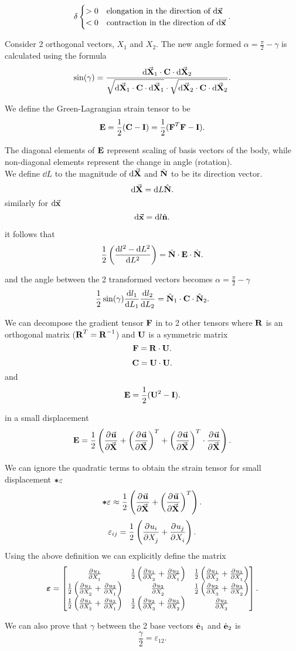 \documentclass{report}
\begin{document}
\[
	\delta \begin{cases}
		>0 & \text{elongation in the direction of }\dd{\va{x}}  \\
		<0 & \text{contraction in the direction of }\dd{\va{x}}
	\end{cases}
	.\]

Consider 2 orthogonal vectors, $X_1$ and $X_2$. The new angle formed $\alpha = \frac{\pi}{2}-\gamma$ is calculated using the formula
\[
	\sin(\gamma) = \frac{\dd{\va{X}}_1\cdot\vb{C}\cdot\dd{\va{X}_2}}{\sqrt{\dd{\va{X}}_1\cdot\vb{C}\cdot\dd{\va{X}_1}}\cdot\sqrt{\dd{\va{X}}_2\cdot\vb{C}\cdot\dd{\va{X}_2}}}
	.\]

We define the Green-Lagrangian strain tensor to be
\[
	\vb{E}=\frac{1}{2}(\vb{C}-\vb{I}) = \frac{1}{2}(\vb{F}^T\vb{F}-\vb{I})
	.\]

The diagonal elements of $\vb{E}$ represent scaling of basis vectors of the body, while non-diagonal elements represent the change in angle (rotation).\\

We define $\dd{L}$ to the magnitude of $\dd{\va{X}}$ and $\vu{N}$ to be its direction vector.
\[
	\dd{\va{X}} = \dd{L}\vu{N}
	.\]
similarly for $\dd{\va{x}}$
\[
	\dd{\va{x}} = \dd{l}\vu{n}
	.\]

it follows that
\[
	\frac{1}{2}\lt(\frac{\dd{l}^2-\dd{L}^2}{\dd{L}^2}\rt) = \vu{N}\cdot\vb{E}\cdot\vu{N}
	.\]

and the angle between the 2 transformed vectors becomes $\alpha = \frac{\pi}{2}-\gamma$
\[
	\frac{1}{2}\sin(\gamma)\dv{l_1}{L_1}\dv{l_2}{L_2}=\vu{N}_1\cdot \vb{C}\cdot\vu{N}_2
	.\]

We can decompose the gradient tensor $\vb{F}$ in to 2 other tensors where $\vb{R}$ is an orthogonal matrix ($\vb{R}^T = \vb{R}^{-1}$) and $\vb{U}$ is a symmetric matrix
\[
	\vb{F}=\vb{R}\cdot\vb{U}
	.\]

\[
	\vb{C} = \vb{U}\cdot\vb{U}
	.\]
and
\[
	\vb{E} = \frac{1}{2}(\vb{U}^2-\vb{I})
	.\]

in a small displacement
\[
	\vb{E} = \frac{1}{2}\lt(\pdv{\va{u}}{\va{X}} + \lt(\pdv{\va{u}}{\va{X}}\rt)^T + \lt(\pdv{\va{u}}{\va{X}}\rt)^T\cdot \pdv{\va{u}}{\va{X}}\rt)
	.\]

We can ignore the quadratic terms to obtain the strain tensor for small displacement $\vb*{\varepsilon}$
\[
	\vb*{\varepsilon} \approx \frac{1}{2}\lt(\pdv{\va{u}}{\va{X}} + \lt(\pdv{\va{u}}{\va{X}}\rt)^T\rt)
	.\]
\[
	\varepsilon_{ij} = \frac{1}{2}\lt(\pdv{u_i}{X_j} + \pdv{u_j}{X_i}\rt)
	.\]
Using the above definition we can explicitly define the matrix
\[
	\vb{\varepsilon} = \begin{bmatrix}
		\pdv{u_1}{X_1}                                     & \frac{1}{2}\lt(\pdv{u_1}{X_2} + \pdv{u_2}{X_1}\rt) & \frac{1}{2}\lt(\pdv{u_1}{X_3} + \pdv{u_3}{X_1}\rt) \\
		\frac{1}{2}\lt(\pdv{u_1}{X_2} + \pdv{u_2}{X_1}\rt) & \pdv{u_2}{X_2}                                     & \frac{1}{2}\lt(\pdv{u_2}{X_3} + \pdv{u_3}{X_2}\rt) \\
		\frac{1}{2}\lt(\pdv{u_1}{X_3} + \pdv{u_3}{X_1}\rt) & \frac{1}{2}\lt(\pdv{u_2}{X_3} + \pdv{u_3}{X_2}\rt) & \pdv{u_3}{X_3}
	\end{bmatrix}
	.\]

We can also prove that $\gamma$ between the 2 base vectors $\vu{e}_1$ and $\vu{e}_2$ is
\[
	\frac{\gamma}{2} = \varepsilon_{12}
	.\]
\end{document}
